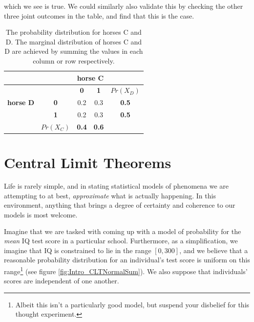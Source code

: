 \documentclass[11pt,fullpage]{book}
\begin{document}
which we see is true. We could similarly also validate this by checking the other three joint outcomes in the table, and find that this is the case.

\begin{table}[htbp]
  \centering
    \begin{tabular}{rrccr}
    \toprule
          &       & \multicolumn{2}{c}{\textbf{horse C}} &  \\
    \midrule
          &       & \textbf{0} & \textbf{1} & \multicolumn{1}{c}{\textbf{$Pr(X_D)$}} \\
    \multicolumn{1}{c}{\textbf{horse D}} & \multicolumn{1}{c}{\textbf{0}} & 0.2   & 0.3   & \multicolumn{1}{c}{\textbf{0.5}} \\
    \multicolumn{1}{c}{} & \multicolumn{1}{c}{\textbf{1}} & 0.2   & 0.3   & \multicolumn{1}{c}{\textbf{0.5}} \\
          & \multicolumn{1}{c}{\textbf{$Pr(X_C)$}} & \textbf{0.4} & \textbf{0.6} & \multicolumn{1}{c}{} \\
    \bottomrule
    \end{tabular}%
  \caption{The probability distribution for horses C and D. The marginal distribution of horses C and D are achieved by summing the values in each column or row respectively.}\label{tab:Intro_horsesIndependent}%
\end{table}%


\section{Central Limit Theorems}\label{sec:Intro_CLT}
Life is rarely simple, and in stating statistical models of phenomena we are attempting to at best, \textit{approximate} what is actually happening. In this environment, anything that brings a degree of certainty and coherence to our models is most welcome. 

Imagine that we are tasked with coming up with a model of probability for the \textit{mean} IQ test score in a particular school. Furthermore, as a simplification, we imagine that IQ is constrained to lie in the range $\left[0,300\right]$, and we believe that a reasonable probability distribution for an individual's test score is uniform on this range\footnote{Albeit this isn't a particularly good model, but suspend your disbelief for this thought experiment.} (see figure \ref{fig:Intro_CLTNormalSum}). We also suppose that individuals' scores are independent of one another.
\end{document}
